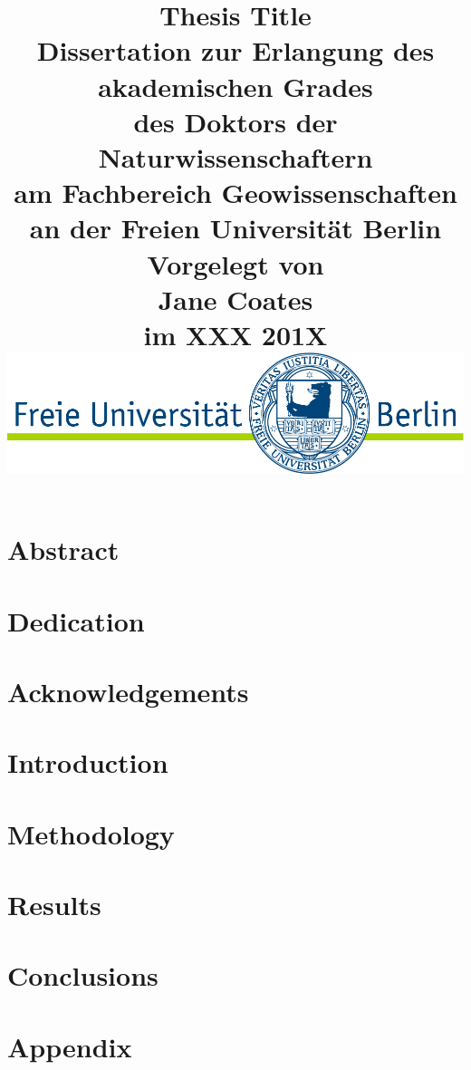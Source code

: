 \documentclass[12pt,twoside,openright,a4paper]{report}
\title{
    \textbf{{\large{Thesis Title}}}\\ \vspace{2cm}
    \normalsize{{Dissertation zur Erlangung des akademischen Grades} \\
    {des Doktors der Naturwissenschaftern} \\
    {am Fachbereich Geowissenschaften} \\
    {an der Freien Universit\"{a}t Berlin}\\} \vspace{2cm}
    \textbf{{Vorgelegt von} \\
    {Jane Coates} \\
    {im XXX 201X} \\} \vspace{3cm}
    {\includegraphics[scale=0.5]{img/FU_logo}}
}
\author{\vspace{-5ex}}
\date{\vspace{-5ex}}
\begin{document}
\maketitle
\clearpage{\pagestyle{empty}\cleardoublepage}


\clearpage{\pagestyle{empty}\cleardoublepage}


\chapter*{Abstract}
\clearpage{\pagestyle{empty}\cleardoublepage}
\chapter*{Dedication}
\clearpage{\pagestyle{empty}\cleardoublepage}
\chapter*{Acknowledgements}
\clearpage{\pagestyle{empty}\cleardoublepage}

\tableofcontents{\fancyhead[LE]{\contentsname}\fancyhead[RE]{}}
\clearpage{\pagestyle{empty}\cleardoublepage}
\listoffigures{\fancyhead[LE]{\contentsname}\fancyhead[RE]{}}
\clearpage{\pagestyle{empty}\cleardoublepage}
\listoftables{\fancyhead[LE]{\contentsname}\fancyhead[RE]{}}
\clearpage{\pagestyle{empty}\cleardoublepage}

\chapter{Introduction} \label{s:introduction}

\clearpage{\pagestyle{empty}\cleardoublepage}

\chapter{Methodology} \label{s:methodology}
\clearpage{\pagestyle{empty}\cleardoublepage}

\chapter{Results} \label{s:results}
\clearpage{\pagestyle{empty}\cleardoublepage}

\chapter{Conclusions} \label{s:conclusions}
\clearpage{\pagestyle{empty}\cleardoublepage}

\chapter*{Appendix}
\clearpage{\pagestyle{empty}\cleardoublepage}


 
\end{document}
